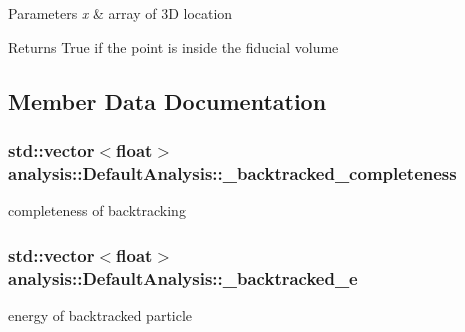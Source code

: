\begin{DoxyParams}{Parameters}
{\em x} & array of 3D location \\
\hline
\end{DoxyParams}
\begin{DoxyReturn}{Returns}
True if the point is inside the fiducial volume 
\end{DoxyReturn}


\subsection{Member Data Documentation}
\subsubsection[{\texorpdfstring{\+\_\+backtracked\+\_\+completeness}{_backtracked_completeness}}]{\setlength{\rightskip}{0pt plus 5cm}std\+::vector$<$float$>$ analysis\+::\+Default\+Analysis\+::\+\_\+backtracked\+\_\+completeness\hspace{0.3cm}{\ttfamily [private]}}\hypertarget{classanalysis_1_1DefaultAnalysis_a60ef3ec6e332c118c088e0203fb858d6}{}\label{classanalysis_1_1DefaultAnalysis_a60ef3ec6e332c118c088e0203fb858d6}
completeness of backtracking 
\subsubsection[{\texorpdfstring{\+\_\+backtracked\+\_\+e}{_backtracked_e}}]{\setlength{\rightskip}{0pt plus 5cm}std\+::vector$<$float$>$ analysis\+::\+Default\+Analysis\+::\+\_\+backtracked\+\_\+e\hspace{0.3cm}{\ttfamily [private]}}\hypertarget{classanalysis_1_1DefaultAnalysis_a2c16b4988d0bccf8b7ef96a52c173b80}{}\label{classanalysis_1_1DefaultAnalysis_a2c16b4988d0bccf8b7ef96a52c173b80}
energy of backtracked particle 
